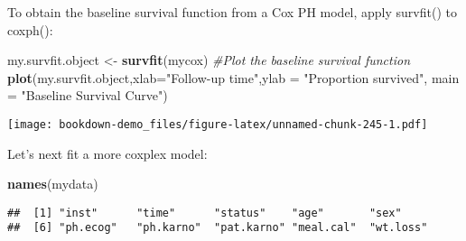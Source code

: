 \documentclass[]{book}
\newenvironment{Shaded}{\begin{snugshade}}{\end{snugshade}}
\newcommand{\KeywordTok}[1]{\textcolor[rgb]{0.13,0.29,0.53}{\textbf{#1}}}
\newcommand{\DataTypeTok}[1]{\textcolor[rgb]{0.13,0.29,0.53}{#1}}
\newcommand{\DecValTok}[1]{\textcolor[rgb]{0.00,0.00,0.81}{#1}}
\newcommand{\StringTok}[1]{\textcolor[rgb]{0.31,0.60,0.02}{#1}}
\newcommand{\CommentTok}[1]{\textcolor[rgb]{0.56,0.35,0.01}{\textit{#1}}}
\newcommand{\OperatorTok}[1]{\textcolor[rgb]{0.81,0.36,0.00}{\textbf{#1}}}
\newcommand{\NormalTok}[1]{#1}
\theoremstyle{definition}
\theoremstyle{definition}
\theoremstyle{definition}
\theoremstyle{remark}
\begin{document}
To obtain the baseline survival function from a Cox PH model, apply
survfit() to coxph():

\begin{Shaded}
\begin{Highlighting}[]
\NormalTok{my.survfit.object <-}\StringTok{ }\KeywordTok{survfit}\NormalTok{(mycox)}
\CommentTok{#Plot the baseline survival function}
\KeywordTok{plot}\NormalTok{(my.survfit.object,}\DataTypeTok{xlab=}\StringTok{"Follow-up time"}\NormalTok{,}\DataTypeTok{ylab =} \StringTok{"Proportion survived"}\NormalTok{,}
     \DataTypeTok{main =} \StringTok{"Baseline Survival Curve"}\NormalTok{)}
\end{Highlighting}
\end{Shaded}

\texttt{[image: bookdown-demo\_files/figure-latex/unnamed-chunk-245-1.pdf]}

Let's next fit a more coxplex model:

\begin{Shaded}
\begin{Highlighting}[]
\KeywordTok{names}\NormalTok{(mydata)}
\end{Highlighting}
\end{Shaded}

\begin{verbatim}
##  [1] "inst"      "time"      "status"    "age"       "sex"      
##  [6] "ph.ecog"   "ph.karno"  "pat.karno" "meal.cal"  "wt.loss"
\end{verbatim}

\begin{Shaded}
\end{Shaded}
\end{document}
